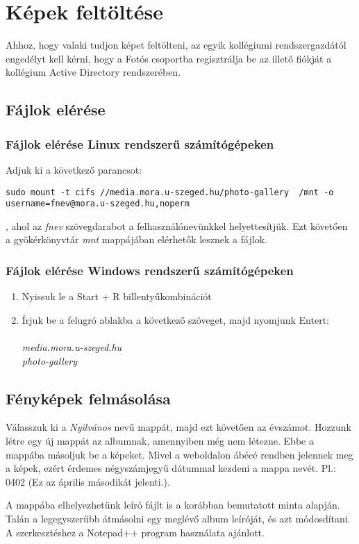 ﻿\documentclass[12pt]{article}
\begin{document}
\section{Képek feltöltése}
Ahhoz, hogy valaki tudjon képet feltölteni, az egyik kollégiumi rendszergazdától engedélyt kell kérni, hogy a Fotós csoportba regisztrálja be az illető fiókját a kollégium Active Directory rendszerében.

\subsection{Fájlok elérése}
\subsubsection{Fájlok elérése Linux rendszerű számítógépeken}
Adjuk ki a következő parancsot:
\begin{lstlisting}
sudo mount -t cifs //media.mora.u-szeged.hu/photo-gallery  /mnt -o username=fnev@mora.u-szeged.hu,noperm
\end{lstlisting}
, ahol az \textit{fnev} szövegdarabot a felhasználónevünkkel helyettesítjük. Ezt követően a gyökérkönyvtár \textit{mnt} mappájában elérhetők lesznek a fájlok.

\subsubsection{Fájlok elérése Windows rendszerű számítógépeken}
\begin{enumerate}
\item Nyissuk le a Start + R billentyűkombinációt
\item Írjuk be a felugró ablakba a következő szöveget, majd nyomjunk Entert: \textit{\\\\media.mora.u-szeged.hu\\photo-gallery}
\end{enumerate}

\subsection{Fényképek felmásolása}
Válasszuk ki a \textit{Nyilvános} nevű mappát, majd ezt követően az évszámot. Hozzunk létre egy új mappát az albumnak, amennyiben még nem létezne. Ebbe a mappába másoljuk be a képeket. Mivel a weboldalon ábécé rendben jelennek meg a képek, ezért érdemes négyszámjegyű dátummal kezdeni a mappa nevét. Pl.: 0402 (Ez az április másodikát jelenti.).

A mappába elhelyezhetünk leíró fájlt is a korábban bemutatott minta alapján. Talán a legegyszerűbb átmásolni egy meglévő album leíróját, és azt módosdítani. A szerkesztéshez a Notepad++ program használata ajánlott.
\end{document}
